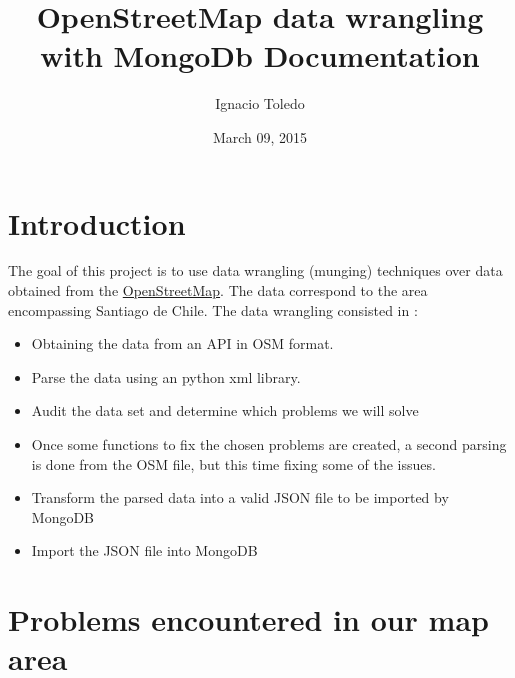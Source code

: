 \documentclass[a4paper,10pt,english]{sphinxhowto}
\title{OpenStreetMap data wrangling with MongoDb Documentation}
\date{March 09, 2015}
\author{Ignacio Toledo}
\begin{document}
\maketitle
\tableofcontents
{}\label{index::doc}



\section{Introduction}
\label{index:introduction}\label{index:openstreetmap-data-wrangling-with-mongodb}
The goal of this project is to use data wrangling (munging) techniques over data
obtained from the \href{http://www.openstreetmap.org}{OpenStreetMap}. The data
correspond to the area encompassing Santiago de Chile. The data wrangling
consisted in :
\begin{itemize}
\item {} 
Obtaining the data from an API in OSM format.

\item {} 
Parse the data using an python xml library.

\item {} 
Audit the data set and determine which problems we will solve

\item {} 
Once some functions to fix the chosen problems are created, a second parsing
is done from the OSM file, but this time fixing some of the issues.

\item {} 
Transform the parsed data into a valid JSON file to be imported by MongoDB

\item {} 
Import the JSON file into MongoDB

\end{itemize}


\section{Problems encountered in our map area}
\label{index:problems-encountered-in-our-map-area}
\end{document}
